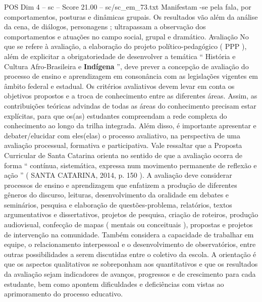 \begin{textsample}{POS Dim 4 – sc – Score 21.00 – sc/sc\_em\_73.txt}
Manifestam -se pela fala, por comportamentos, posturas e dinâmicas grupais.
Os resultados vão além da análise da cena, de diálogos, personagens ; ultrapassam a observação dos comportamentos e atuações no campo social, grupal e dramático.
Avaliação No que se refere à avaliação, a elaboração do projeto político-pedagógico ( PPP ), além de explicitar a obrigatoriedade de desenvolver a temática “ História e Cultura Afro-Brasileira e \textbf{Indígena} ”, deve prever a concepção de avaliação do processo de ensino e aprendizagem em consonância com as legislações vigentes em âmbito federal e estadual.
Os critérios avaliativos devem levar em conta os objetivos propostos e a troca de conhecimento entre as diferentes áreas.
Assim, as contribuições teóricas advindas de todas as áreas do conhecimento precisam estar explícitas, para que os(as) estudantes compreendam a rede complexa do conhecimento ao longo da trilha integrada.
Além disso, é importante apresentar e debater/elucidar com eles(elas) o processo avaliativo, na perspectiva de uma avaliação processual, formativa e participativa.
Vale ressaltar que a Proposta Curricular de Santa Catarina orienta no sentido de que a avaliação ocorra de forma “ contínua, sistemática, expressa num movimento permanente de reflexão e ação ” ( SANTA CATARINA, 2014, p. 150 ).
A avaliação deve considerar processos de ensino e aprendizagem que enfatizem a produção de diferentes gêneros do discurso, leituras, desenvolvimento da oralidade em debates e seminários, pesquisa e elaboração de questões-problema, relatórios, textos argumentativos e dissertativos, projetos de pesquisa, criação de roteiros, produção audiovisual, confecção de mapas ( mentais ou conceituais ), propostas e projetos de intervenção na comunidade.
Também considera a capacidade de trabalhar em equipe, o relacionamento interpessoal e o desenvolvimento de observatórios, entre outras possibilidades a serem discutidas entre o coletivo da escola.
A orientação é que os aspectos qualitativos se sobreponham aos quantitativos e que os resultados da avaliação sejam indicadores de avanços, progressos e de crescimento para cada estudante, bem como apontem dificuldades e deficiências com vistas ao aprimoramento do processo educativo.

\end{textsample}
